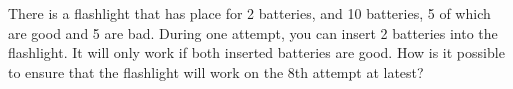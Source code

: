 \problem
There is a flashlight that has place for 2 batteries, and 10 batteries,
5 of which are good and 5 are bad.
During one attempt, you can insert 2 batteries into the flashlight.
It will only work if both inserted batteries are good.
How is it possible to ensure that the flashlight will work on the 8th attempt
at latest?
\solution
\endproblem
